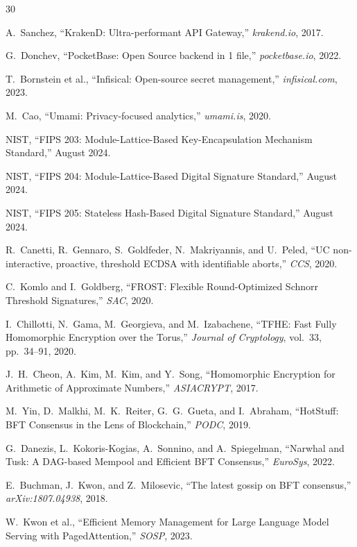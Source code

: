 \documentclass[11pt,twocolumn]{article}
\begin{document}
\begin{thebibliography}{30}

A.~Sanchez, ``KrakenD: Ultra-performant API Gateway,'' \textit{krakend.io}, 2017.

G.~Donchev, ``PocketBase: Open Source backend in 1 file,'' \textit{pocketbase.io}, 2022.

T.~Bornstein et al., ``Infisical: Open-source secret management,'' \textit{infisical.com}, 2023.

M.~Cao, ``Umami: Privacy-focused analytics,'' \textit{umami.is}, 2020.

NIST, ``FIPS 203: Module-Lattice-Based Key-Encapsulation Mechanism Standard,'' August 2024.

NIST, ``FIPS 204: Module-Lattice-Based Digital Signature Standard,'' August 2024.

NIST, ``FIPS 205: Stateless Hash-Based Digital Signature Standard,'' August 2024.

R.~Canetti, R.~Gennaro, S.~Goldfeder, N.~Makriyannis, and U.~Peled, ``UC non-interactive, proactive, threshold ECDSA with identifiable aborts,'' \textit{CCS}, 2020.

C.~Komlo and I.~Goldberg, ``FROST: Flexible Round-Optimized Schnorr Threshold Signatures,'' \textit{SAC}, 2020.

I.~Chillotti, N.~Gama, M.~Georgieva, and M.~Izabachene, ``TFHE: Fast Fully Homomorphic Encryption over the Torus,'' \textit{Journal of Cryptology}, vol.~33, pp.~34--91, 2020.

J.~H.~Cheon, A.~Kim, M.~Kim, and Y.~Song, ``Homomorphic Encryption for Arithmetic of Approximate Numbers,'' \textit{ASIACRYPT}, 2017.

M.~Yin, D.~Malkhi, M.~K.~Reiter, G.~G.~Gueta, and I.~Abraham, ``HotStuff: BFT Consensus in the Lens of Blockchain,'' \textit{PODC}, 2019.

G.~Danezis, L.~Kokoris-Kogias, A.~Sonnino, and A.~Spiegelman, ``Narwhal and Tusk: A DAG-based Mempool and Efficient BFT Consensus,'' \textit{EuroSys}, 2022.

E.~Buchman, J.~Kwon, and Z.~Milosevic, ``The latest gossip on BFT consensus,'' \textit{arXiv:1807.04938}, 2018.

W.~Kwon et al., ``Efficient Memory Management for Large Language Model Serving with PagedAttention,'' \textit{SOSP}, 2023.


\end{thebibliography}
\end{document}
